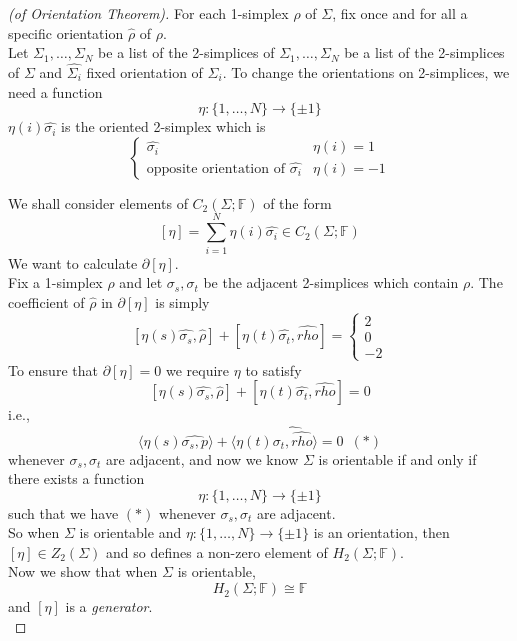 \documentclass[a4paper,14pt]{extarticle}
\theoremstyle{definition}
\begin{document}
\begin{proof}[(of Orientation Theorem)]
	For each 1-simplex $\rho$ of $\Sigma$, fix once and for all a specific orientation 
	$\hat{\rho}$ of $\rho$. \\

	Let $\Sigma_1,\ldots,\Sigma_N$ be a list of the 2-simplices of $\Sigma_1,\ldots,\Sigma_N$
	be a list of the 2-simplices of $\Sigma$ and $\hat{\Sigma_i}$ fixed orientation of
	$\Sigma_i$. To change the orientations on 2-simplices, we need a function 
	\[\eta:\{1,\ldots,N\}\rightarrow\{\pm1\}\]
	$\eta(i)\hat{\sigma_i}$ is the oriented 2-simplex which is 
	\[\begin{cases}
		\hat{\sigma_i}&\eta(i)=1 \\ \text{opposite orientation of }\hat{\sigma_i}&\eta(i)=-1
	\end{cases}\]

We shall consider elements of $C_2(\Sigma;\mathbb{F})$ of the form 
\[[\eta]=\sum_{i=1}^N\eta(i)\hat{\sigma_i}\in C_2(\Sigma;\mathbb{F})\] We want to calculate 
$\partial[\eta]$. \\

Fix a 1-simplex $\rho$ and let $\sigma_s,\sigma_t$ be the adjacent 2-simplices which contain 
$\rho$. The coefficient of $\hat{\rho}$ in $\partial[\eta]$ is simply
\[[\eta(s)\hat{\sigma_s},\hat{\rho}]+[\eta(t)\hat{\sigma_t},\hat{rho}]=\begin{cases}
	2\\0\\-2
\end{cases}\]
To ensure that $\partial[\eta]=0$ we require $\eta$ to satisfy 
\[[\eta(s)\hat{\sigma_s},\hat{\rho}]+[\eta(t)\hat{\sigma_t},\hat{rho}]=0\]
i.e.,
\[\langle\eta(s)\hat{\sigma_s,p}\rangle+\langle\eta(t)\hat{\sigma_t,\hat{rho}}\rangle=0\,\,\,(*)\]
whenever $\sigma_s,\sigma_t$ are adjacent, and now we know
$\Sigma$ is orientable if and only if there exists a function \[\eta:\{1,\ldots,N\}
\rightarrow\{\pm1\}\] such that we have $(*)$ whenever $\sigma_s,\sigma_t$ are adjacent. \\

So when $\Sigma$ is orientable and $\eta:\{1,\ldots,N\}\rightarrow\{\pm1\}$ is an orientation,
then $[\eta]\in Z_2(\Sigma)$ and so defines a non-zero element of $H_2(\Sigma;\mathbb{F})$. \\

Now we show that when $\Sigma$ is orientable, \[H_2(\Sigma;\mathbb{F})\cong\mathbb{F}\] and
$[\eta]$ is a \emph{generator}. \\


\end{proof}
\end{document}

